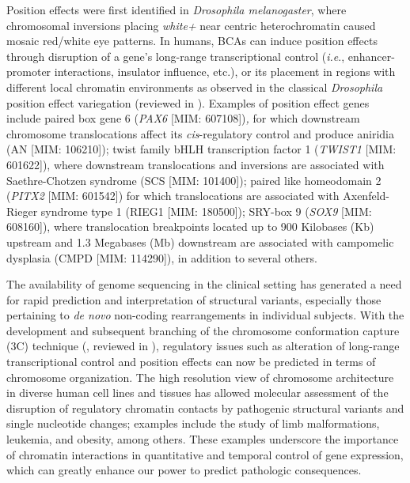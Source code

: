 \documentclass[a4paper,twoside=true,openright,parskip=full,chapterprefix=true,11pt,headings=normal,bibliography=totoc,listof=totoc,titlepage=on,captions=tableabove,draft=false]{scrreprt}
\theoremstyle{definition}
\theoremstyle{definition}
\theoremstyle{definition}
\theoremstyle{remark}
\begin{document}
Position effects were first identified in \emph{Drosophila
melanogaster}, where chromosomal inversions placing \emph{white+} near
centric heterochromatin caused mosaic red/white eye
patterns.\citep{Weiler1995} In humans, BCAs can induce position effects
through disruption of a gene's long-range transcriptional control
(\emph{i.e}., enhancer-promoter interactions, insulator influence,
etc.), or its placement in regions with different local chromatin
environments as observed in the classical \emph{Drosophila} position
effect variegation (reviewed in
\citep{Kleinjan2005, Zhang2015, Spielmann2016}). Examples of position
effect genes include paired box gene 6 (\emph{PAX6} {[}MIM:
607108{]})\emph{,} for which downstream chromosome translocations affect
its \emph{cis}-regulatory control and produce aniridia (AN {[}MIM:
106210{]});\citep{Fantes1995, Kleinjan2001} twist family bHLH
transcription factor 1 (\emph{TWIST1} {[}MIM: 601622{]}), where
downstream translocations and inversions are associated with
Saethre-Chotzen syndrome (SCS {[}MIM: 101400{]});\citep{Cai2003} paired
like homeodomain 2 (\emph{PITX2} {[}MIM: 601542{]}) for which
translocations are associated with Axenfeld-Rieger syndrome type 1
(RIEG1 {[}MIM: 180500{]});\citep{Flomen1998, Trembath2004} SRY-box 9
(\emph{SOX9} {[}MIM: 608160{]}), where translocation breakpoints located
up to 900 Kilobases (Kb) upstream and 1.3 Megabases (Mb) downstream are
associated with campomelic dysplasia (CMPD {[}MIM:
114290{]}),\citep{Velagaleti2005} in addition to several
others.\citep{Kleinjan2005, Kleinjan1998, Lupski2005}

The availability of genome sequencing in the clinical setting has
generated a need for rapid prediction and interpretation of structural
variants, especially those pertaining to \emph{de novo} non-coding
rearrangements in individual subjects. With the development and
subsequent branching of the chromosome conformation capture (3C)
technique (\citep{Dekker2002}, reviewed in \citep{DeWit2012}),
regulatory issues such as alteration of long-range transcriptional
control and position effects can now be predicted in terms of chromosome
organization. The high resolution view of chromosome architecture in
diverse human cell lines and
tissues\citep{Lieberman-Aiden2009, Fullwood2009, Dixon2012, Sanyal2012, Phillips-Cremins2013, Rao2014, Mifsud2015, Dixon2015}
has allowed molecular assessment of the disruption of regulatory
chromatin contacts by pathogenic structural variants and single
nucleotide changes; examples include the study of limb
malformations,\citep{Lupianez2015} leukemia,\citep{Groschel2014} and
obesity,\citep{Claussnitzer2015} among
others.\citep{Visser2012, Roussos2014, Giorgio2015, Oldridge2015, Ibn-Salem2014, Ordulu2016}
These examples underscore the importance of chromatin interactions in
quantitative and temporal control of gene expression, which can greatly
enhance our power to predict pathologic consequences.
\end{document}
